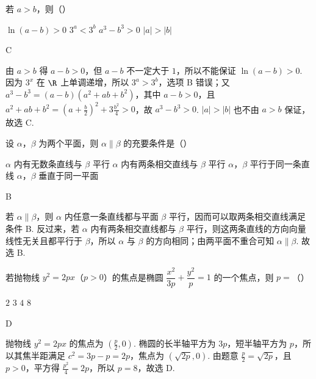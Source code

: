 \begin{problem}
若 \(a>b\)，则（\quad）

\choices
    {\(\ln(a-b)>0\)}
    {\(3^a<3^b\)}
    {\(a^3-b^3>0\)}
    {\(|a|>|b|\)}
\end{problem}

\begin{answer}
C
\end{answer}

\begin{solution}
由 \(a>b\) 得 \(a-b>0\)，但 \(a-b\) 不一定大于 \(1\)，所以不能保证 \(\ln(a-b)>0\). 因为 \(3^x\) 在 \(\R\) 上单调递增，所以 \(3^a>3^b\)，选项 B 错误；又 \(a^3-b^3=(a-b)(a^2+ab+b^2)\)，其中 \(a-b>0\)，且 \(a^2+ab+b^2=(a+\frac{b}{2})^2+3\frac{b^2}{4}>0\)，故 \(a^3-b^3>0\). \(|a|>|b|\) 也不由 \(a>b\) 保证，故选 C.
\end{solution}

\begin{problem}
设 \(\alpha\)，\(\beta\) 为两个平面，则 \(\alpha\parallel\beta\) 的充要条件是（\quad）

\choices
    {\(\alpha\) 内有无数条直线与 \(\beta\) 平行}
    {\(\alpha\) 内有两条相交直线与 \(\beta\) 平行}
    {\(\alpha\)，\(\beta\) 平行于同一条直线}
    {\(\alpha\)，\(\beta\) 垂直于同一平面}
\end{problem}

\begin{answer}
B
\end{answer}

\begin{solution}
若 \(\alpha\parallel\beta\)，则 \(\alpha\) 内任意一条直线都与平面 \(\beta\) 平行，因而可以取两条相交直线满足条件 B. 反过来，若 \(\alpha\) 内有两条相交直线都与 \(\beta\) 平行，则这两条直线的方向向量线性无关且都平行于 \(\beta\)，所以 \(\alpha\) 与 \(\beta\) 的方向相同；由两平面不重合可知 \(\alpha\parallel\beta\). 故选 B.
\end{solution}

\begin{problem}
若抛物线 \(y^2=2px\)（\(p>0\)）的焦点是椭圆 \(\dfrac{x^2}{3p}+\dfrac{y^2}{p}=1\) 的一个焦点，则 \(p=\)（\quad）

\choices
    {\(2\)}
    {\(3\)}
    {\(4\)}
    {\(8\)}
\end{problem}

\begin{answer}
D
\end{answer}

\begin{solution}
抛物线 \(y^2=2px\) 的焦点为 \((\frac{p}{2},0)\). 椭圆的长半轴平方为 \(3p\)，短半轴平方为 \(p\)，所以其焦半距满足 \(c^2=3p-p=2p\)，焦点为 \((\sqrt{2p},0)\). 由题意 \(\frac{p}{2}=\sqrt{2p}\)，且 \(p>0\)，平方得 \(\frac{p^2}{4}=2p\)，所以 \(p=8\)，故选 D.
\end{solution}

